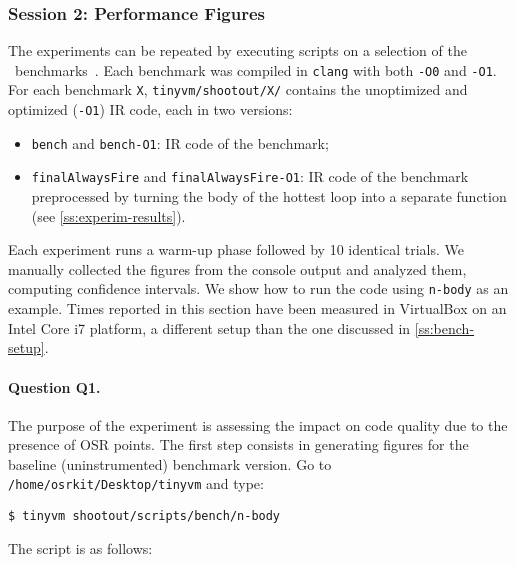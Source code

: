 
\subsubsection{Session 2: Performance Figures}

The experiments can be repeated by executing scripts on a selection of the \shootout\ benchmarks~\cite{shootout}. Each benchmark was compiled in {\tt clang} with both {\tt -O0} and {\tt -O1}. For each benchmark {\tt X}, {\tt tinyvm/shootout/X/} contains the unoptimized and optimized ({\tt -O1}) IR code, each in two versions:

\begin{itemize}[parsep=0pt]
\item {\tt bench} and {\tt bench-O1}: IR code of the benchmark;
\item {\tt finalAlwaysFire} and {\tt finalAlwaysFire-O1}: IR code of the benchmark preprocessed by turning the body of the hottest loop into a separate function (see \ref{ss:experim-results}).
\end{itemize}

\noindent Each experiment runs a warm-up phase followed by 10 identical trials. We manually collected the figures from the console output and analyzed them, computing confidence intervals. We show how to run the code using {\tt n-body} as an example. Times reported in this section have been measured in VirtualBox on an Intel Core i7 platform, a different setup than the one discussed in \ref{ss:bench-setup}.

\paragraph{Question Q1.} The purpose of the experiment is assessing the impact on code quality due to the presence of OSR points.
The first step consists in generating figures for the baseline (uninstrumented) benchmark version. Go to {\small\tt /home/osrkit/Desktop/tinyvm} and type:
\begin{small}
\begin{verbatim}
$ tinyvm shootout/scripts/bench/n-body
\end{verbatim}
\end{small}

\noindent The script is as follows:

